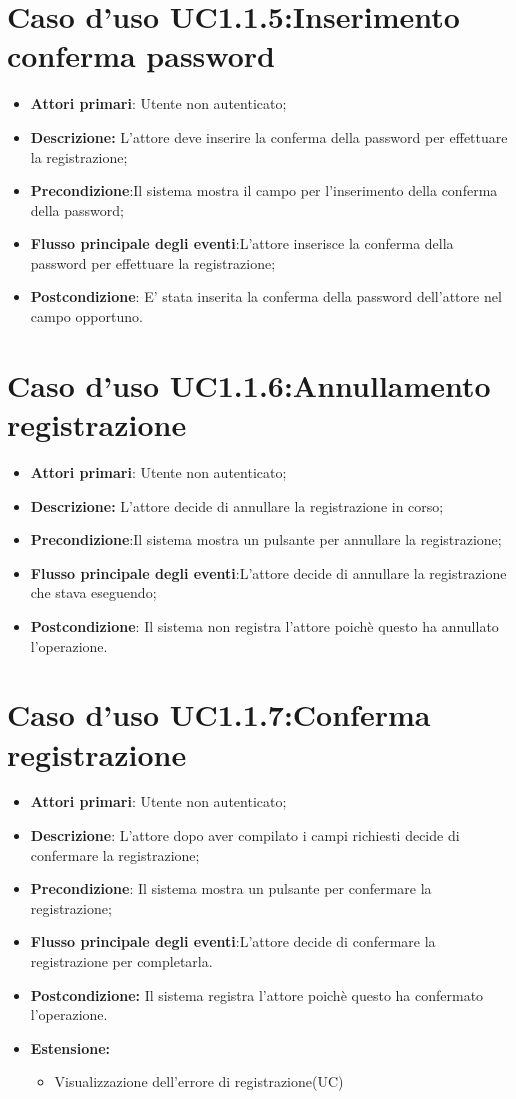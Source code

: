 {{{\section{Caso d'uso UC1.1.5:Inserimento  conferma password}
\begin{itemize}
	\item \textbf{Attori primari}: Utente non autenticato;
	\item \textbf{Descrizione:} L'attore deve inserire la conferma della password per effettuare la registrazione;
	\item \textbf{Precondizione}:Il sistema mostra il campo per l'inserimento della conferma della password;
	\item \textbf{Flusso principale degli eventi}:L'attore inserisce la conferma della password per effettuare la registrazione;
	\item \textbf{Postcondizione}: E' stata inserita la conferma della password dell'attore nel campo opportuno.
\end{itemize}
\section{Caso d'uso UC1.1.6:Annullamento registrazione}
\begin{itemize}
	\item \textbf{Attori primari}: Utente non autenticato;
	\item \textbf{Descrizione:} L'attore decide di annullare la registrazione in corso;
	\item \textbf{Precondizione}:Il sistema mostra un pulsante per annullare la  registrazione;
	\item \textbf{Flusso principale degli eventi}:L'attore decide di annullare la registrazione che stava eseguendo;
	\item \textbf{Postcondizione}: Il sistema non registra l'attore poichè questo ha annullato l'operazione.
\end{itemize}
\section{Caso d'uso UC1.1.7:Conferma registrazione}
\begin{itemize}
	\item \textbf{Attori primari}: Utente non autenticato;
	\item \textbf{Descrizione}: L'attore dopo aver compilato i campi richiesti decide di confermare  la registrazione;
	\item \textbf{Precondizione}: Il sistema mostra un pulsante per confermare la registrazione;
	\item \textbf{Flusso principale degli eventi}:L'attore decide di confermare la registrazione per completarla.
	\item \textbf{Postcondizione:} Il sistema registra l'attore poichè questo ha confermato l'operazione.
	\item \textbf{Estensione:}
	\begin{itemize}
		\item Visualizzazione dell'errore di registrazione(UC)
	\end{itemize}
\end{itemize}
}}}
